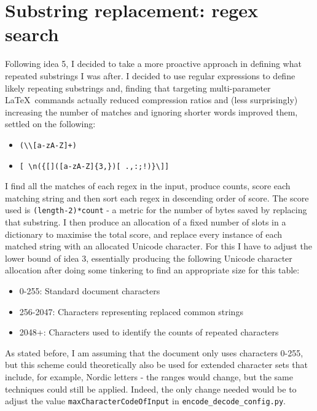 \documentclass[11pt]{article} %
\begin{document}
\section{Substring replacement: regex search}

Following idea 5, I decided to take a more proactive approach in defining what repeated substrings I was after. I decided to use regular expressions to define likely repeating substrings and, finding that targeting multi-parameter \rmfamily\LaTeX\normalfont\ commands actually reduced compression ratios and (less surprisingly) increasing the number of matches and ignoring shorter words improved them, settled on the following:

\begin{itemize}
	\item \verb|(\\[a-zA-Z]+)|
	\item \verb|[ \n({[]([a-zA-Z]{3,})[ .,:;!)}\]]|
\end{itemize}

I find all the matches of each regex in the input, produce counts, score each matching string and then sort each regex in descending order of score. The score used is \verb|(length-2)*count| - a metric for the number of bytes saved by replacing that substring. I then produce an allocation of a fixed number of slots in a dictionary to maximise the total score, and replace every instance of each matched string with an allocated Unicode character. For this I have to adjust the lower bound of idea 3, essentially producing the following Unicode character allocation after doing some tinkering to find an appropriate size for this table:

\begin{itemize}
	\item 0-255: Standard document characters
	\item 256-2047: Characters representing replaced common strings
	\item 2048+: Characters used to identify the counts of repeated characters
\end{itemize}

As stated before, I am assuming that the document only uses characters 0-255, but this scheme could theoretically also be used for extended character sets that include, for example, Nordic letters - the ranges would change, but the same techniques could still be applied. Indeed, the only change needed would be to adjust the value \verb|maxCharacterCodeOfInput| in \verb|encode_decode_config.py|.
\end{document}
